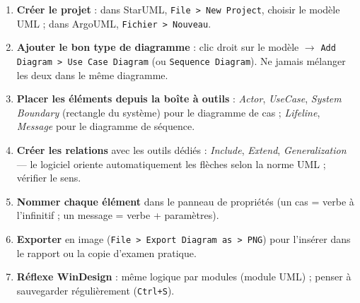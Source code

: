 \documentclass[11pt]{article}
\begin{document}
\begin{methode}
\begin{enumerate}
\item \textbf{Créer le projet} : dans StarUML, \texttt{File > New Project}, choisir le modèle UML ; dans ArgoUML, \texttt{Fichier > Nouveau}.
\item \textbf{Ajouter le bon type de diagramme} : clic droit sur le modèle $\rightarrow$ \texttt{Add Diagram > Use Case Diagram} (ou \texttt{Sequence Diagram}). Ne jamais mélanger les deux dans le même diagramme.
\item \textbf{Placer les éléments depuis la boîte à outils} : \emph{Actor}, \emph{UseCase}, \emph{System Boundary} (rectangle du système) pour le diagramme de cas ; \emph{Lifeline}, \emph{Message} pour le diagramme de séquence.
\item \textbf{Créer les relations} avec les outils dédiés : \emph{Include}, \emph{Extend}, \emph{Generalization} — le logiciel oriente automatiquement les flèches selon la norme UML ; vérifier le sens.
\item \textbf{Nommer chaque élément} dans le panneau de propriétés (un cas = verbe à l'infinitif ; un message = verbe + paramètres).
\item \textbf{Exporter} en image (\texttt{File > Export Diagram as > PNG}) pour l'insérer dans le rapport ou la copie d'examen pratique.
\item \textbf{Réflexe WinDesign} : même logique par modules (module UML) ; penser à sauvegarder régulièrement (\texttt{Ctrl+S}).
\end{enumerate}
\end{methode}
\end{document}
